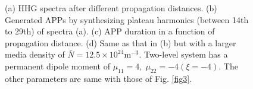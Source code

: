 \documentclass[10pt,letterpaper]{article}
\begin{document}
\begin{figure}[!htbp]
\centering
	\hspace{-0.3in}
	\hspace{-0.3in}
\caption{(a) HHG spectra after different propagation distances. (b) Generated APPs by synthesizing plateau harmonics (between 14th to 29th) of spectra (a). (c) APP duration in a function of propagation distance. (d) Same as that in (b) but with a larger media density of $\bar{N}=12.5\times10^{24} \textrm{m}^{-3}$. Two-level system has a permanent dipole moment of $\mu_{11}=4,\;\mu_{22}=-4(\xi=-4)$. The other parameters are same with those of Fig. \ref{fig3}.}
\label{fig4}
\end{figure}
\end{document}
